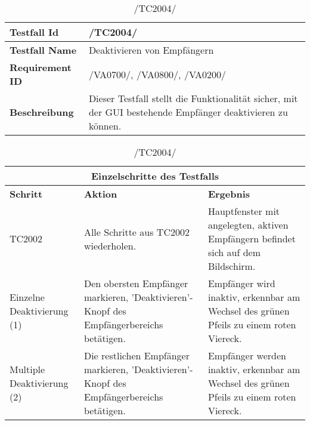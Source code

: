 \begin{table}[h]
\caption{/TC2004/}
\label{tab:TC2004}
\begin{center}
\begin{tabular}{|p{3.5cm}|p{12cm}|}
\hline
\textbf{Testfall Id} & /TC2004/\\
\hline
\textbf{Testfall Name} & Deaktivieren von Empfängern\\
\hline
\textbf{Requirement ID} & /VA0700/, /VA0800/, /VA0200/\\
\hline
\textbf{Beschreibung} & Dieser Testfall stellt die Funktionalität sicher, mit
der GUI bestehende Empfänger deaktivieren zu können.\\
\hline
\end{tabular}
\begin{tabular}{|p{2.5cm}|p{5cm}|p{7.55cm}|}
\multicolumn{3}{|c|}{\textbf{Einzelschritte des Testfalls}} \\
\hline
\textbf{Schritt} & \textbf{Aktion} & \textbf{Ergebnis}\\
\hline
TC2002& Alle Schritte aus TC2002 wiederholen. & Hauptfenster mit angelegten,
aktiven Empfängern befindet sich auf dem Bildschirm.\\
\hline
Einzelne Deaktivierung (1) & Den obersten Empfänger markieren,
'Deaktivieren'-Knopf des Empfängerbereichs betätigen. & Empfänger wird inaktiv,
erkennbar am Wechsel des grünen Pfeils zu einem roten Viereck.\\
\hline
Multiple Deaktivierung (2) & Die restlichen Empfänger markieren,
'Deaktivieren'-Knopf des Empfängerbereichs betätigen. & Empfänger werden
inaktiv, erkennbar am Wechsel des grünen Pfeils zu einem roten Viereck.\\
\hline
\end{tabular}
\end{center}
\label{default}
\end{table}

